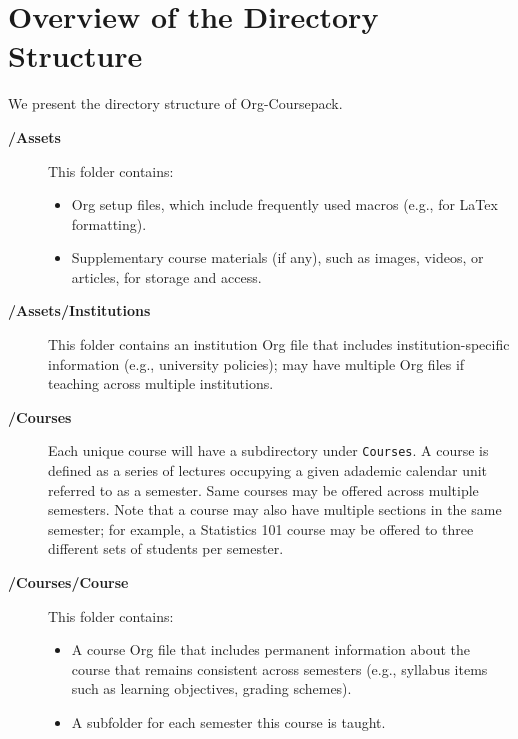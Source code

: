 \documentclass[10pt,article]{article}
\begin{document}
\section{Overview of the Directory Structure}
\label{sec:orgd9ef06b}
We present the directory structure of Org-Coursepack.

\begin{description}
\item[{\textbf{/Assets}}] This folder contains:
\begin{itemize}
\item Org setup files, which include frequently used macros (e.g., for LaTex
formatting).
\item Supplementary course materials (if any), such as images, videos, or
articles, for storage and access.
\end{itemize}
\item[{\textbf{/Assets/Institutions}}] This folder contains an institution Org file that
includes institution-specific information (e.g., university policies);
may have multiple Org files if teaching across multiple institutions.

\item[{\textbf{/Courses}}] Each unique course will have a subdirectory under \texttt{Courses}. A
course is defined as a series of lectures occupying a given
adademic calendar unit referred to as a semester. Same courses
may be offered across multiple semesters. Note that a course
may also have multiple sections in the same semester; for
example, a Statistics 101 course may be offered to three
different sets of students per semester.
\item[{\textbf{/Courses/Course}}] This folder contains:

\begin{itemize}
\item A course Org file that includes permanent information about the course
that remains consistent across semesters (e.g., syllabus items such as
learning objectives, grading schemes).
\item A subfolder for each semester this course is taught.
\end{itemize}


\end{description}
\end{document}
